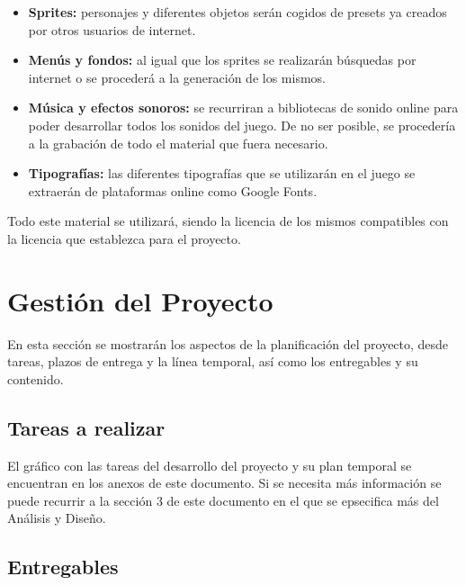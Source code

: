 \documentclass[palatino]{apuntes}
\begin{document}
\begin{itemize}
	\item \textbf{Sprites:} personajes y diferentes objetos serán cogidos de presets ya creados por otros usuarios de internet.
	\item \textbf{Menús y fondos:} al igual que los sprites se realizarán búsquedas por internet o se procederá a la generación de los mismos.
	\item \textbf{Música y efectos sonoros:} se recurriran a bibliotecas de sonido online para poder desarrollar todos los sonidos del juego. De no ser posible, se procedería a la grabación de todo el material que fuera necesario.
	\item \textbf{Tipografías:} las diferentes tipografías que se utilizarán en el juego se extraerán de plataformas online como Google Fonts.
\end{itemize}

Todo este material se utilizará, siendo la licencia de los mismos compatibles con la licencia que establezca para el proyecto.





















\chapter{Gestión del Proyecto}
En esta sección se mostrarán los aspectos de la planificación del proyecto, desde tareas, plazos de entrega y la línea temporal, así como los entregables y su contenido.

\section{Tareas a realizar}
El gráfico con las tareas del desarrollo del proyecto y su plan temporal se encuentran en los anexos de este documento. Si se necesita más información se puede recurrir a la sección 3 de este documento en el que se epsecifica más del Análisis y Diseño.

\section{Entregables}
\end{document}
